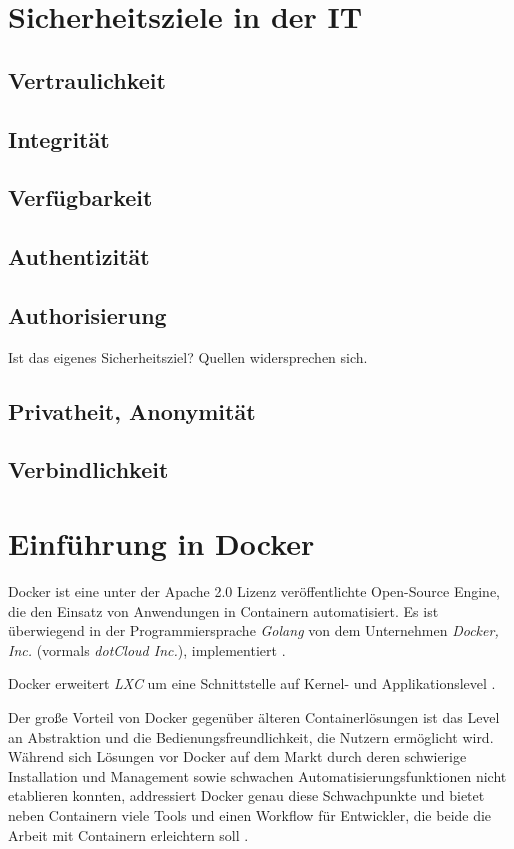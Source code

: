 \documentclass[../main.tex]{subfiles}
\begin{document}
  \section{Sicherheitsziele in der IT}
    \subsection{Vertraulichkeit}
    \subsection{Integrität}
    \subsection{Verfügbarkeit}
    \subsection{Authentizität}
    \subsection{Authorisierung}
      Ist das eigenes Sicherheitsziel? Quellen widersprechen sich.
    \subsection{Privatheit, Anonymität}
    \subsection{Verbindlichkeit}
  \section{Einführung in Docker}
  \label{dockerIntro}
    Docker ist eine unter der Apache 2.0 Lizenz veröffentlichte Open-Source Engine, die den Einsatz von Anwendungen in Containern automatisiert. Es ist überwiegend in der Programmiersprache \emph{Golang} von dem Unternehmen \emph{Docker, Inc.} (vormals \emph{dotCloud Inc.}), implementiert \cite{githubDocker}\cite[S.7]{dockerBook}.

    Docker erweitert \emph{LXC} um eine Schnittstelle auf Kernel- und Applikationslevel \cite[S.2]{dockerLXCKub}.



    Der große Vorteil von Docker gegenüber älteren Containerlösungen ist das Level an Abstraktion und die Bedienungsfreundlichkeit, die Nutzern ermöglicht wird. Während sich Lösungen vor Docker auf dem Markt durch deren schwierige Installation und Management sowie schwachen Automatisierungsfunktionen nicht etablieren konnten, addressiert Docker genau diese Schwachpunkte \cite[S.7]{dockerBook} und bietet neben Containern viele Tools und einen Workflow für Entwickler, die beide die Arbeit mit Containern erleichtern soll \cite[S.1]{dockerIntroIEEE}.
\end{document}
